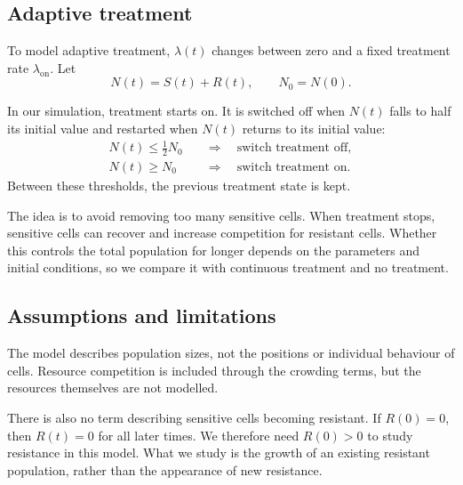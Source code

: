\documentclass{article}
\begin{document}
\subsection{Adaptive treatment}

To model adaptive treatment, $\lambda(t)$ changes between
zero and a fixed treatment rate $\lambda_{\mathrm{on}}$.
Let
\[
N(t)=S(t)+R(t), \qquad N_0=N(0).
\]

In our simulation, treatment starts on. It is switched off
when $N(t)$ falls to half its initial value and restarted
when $N(t)$ returns to its initial value:
\[
\begin{aligned}
N(t)\leq \tfrac12N_0
&\quad\Rightarrow\quad \text{switch treatment off},\\
N(t)\geq N_0
&\quad\Rightarrow\quad \text{switch treatment on}.
\end{aligned}
\]
Between these thresholds, the previous treatment state
is kept.

The idea is to avoid removing too many sensitive cells.
When treatment stops, sensitive cells can recover and
increase competition for resistant cells. Whether this
controls the total population for longer depends on the
parameters and initial conditions, so we compare it with
continuous treatment and no treatment.

\subsection{Assumptions and limitations}

The model describes population sizes, not the positions
or individual behaviour of cells. Resource competition
is included through the crowding terms, but the resources
themselves are not modelled.

There is also no term describing sensitive cells becoming
resistant. If $R(0)=0$, then $R(t)=0$ for all later times.
We therefore need $R(0)>0$ to study resistance in this
model. What we study is the growth of an existing resistant
population, rather than the appearance of new resistance.
\end{document}
